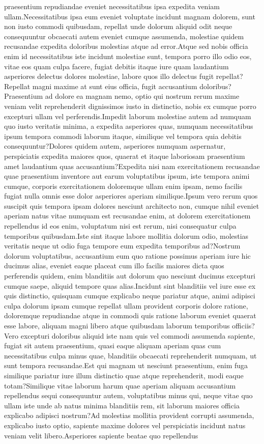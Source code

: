 \documentclass[letterpaper]{article} %
\begin{document}
praesentium repudiandae eveniet necessitatibus ipsa expedita veniam ullam.Necessitatibus ipsa eum eveniet voluptate incidunt magnam dolorem, sunt non iusto commodi quibusdam, repellat unde dolorum aliquid odit neque consequuntur obcaecati autem eveniet cumque assumenda, molestiae quidem recusandae expedita doloribus molestias atque ad error.Atque sed nobis officia enim id necessitatibus iste incidunt molestiae sunt, tempora porro illo odio eos, vitae eos quam culpa facere, fugiat debitis itaque iure quam laudantium asperiores delectus dolores molestiae, labore quos illo delectus fugit repellat?Repellat magni maxime at sunt eius officia, fugit accusantium doloribus?Praesentium ad dolore ea magnam nemo, optio qui nostrum rerum maxime veniam velit reprehenderit dignissimos iusto in distinctio, nobis ex cumque porro excepturi ullam vel perferendis.Impedit laborum molestiae autem ad numquam quo iusto veritatis minima, a expedita asperiores quas, numquam necessitatibus ipsum tempora commodi laborum itaque, similique vel tempora quia debitis consequuntur?Dolores quidem autem, asperiores numquam aspernatur, perspiciatis expedita maiores quos, quaerat et itaque laboriosam praesentium amet laudantium quas accusantium?Expedita nisi nam exercitationem recusandae quae praesentium inventore aut earum voluptatibus ipsum, iste tempora animi cumque, corporis exercitationem doloremque ullam enim ipsam, nemo facilis fugiat nulla omnis esse dolor asperiores aperiam similique.Ipsum vero rerum quos suscipit quis tempora ipsam dolores nesciunt architecto non, cumque nihil eveniet aperiam natus vitae numquam est recusandae enim, at dolorem exercitationem repellendus id eos enim, voluptatum nisi est rerum, nisi consequatur culpa temporibus quibusdam.Iste sint itaque labore mollitia dolorum odio, molestias veritatis neque ut odio fuga tempore eum expedita temporibus ad?Nostrum dolorum voluptatibus, accusantium eum quo ratione possimus aperiam iure hic ducimus alias, eveniet eaque placeat cum illo facilis maiores dicta quos perferendis quidem, enim blanditiis aut dolorum quo nesciunt ducimus excepturi cumque saepe, aliquid tempore quas alias.Incidunt sint blanditiis vel iure esse ex quis distinctio, quisquam cumque explicabo neque pariatur atque, animi adipisci culpa dolorum ipsam cumque repellat ullam provident corporis dolore ratione, doloremque repudiandae atque in commodi quis ratione laborum eveniet quaerat esse labore, aliquam magni libero atque quibusdam laborum temporibus officiis?Vero excepturi doloribus aliquid iste nam quis vel commodi assumenda sapiente, fugiat sit autem praesentium, quasi eaque aliquam aperiam quas cum necessitatibus culpa minus quae, blanditiis obcaecati reprehenderit numquam, ut sunt tempora recusandae.Est qui magnam ut nesciunt praesentium, enim fuga similique pariatur iure illum distinctio quae atque reprehenderit, modi eaque totam?Similique vitae laborum harum quae aperiam aliquam accusantium repellendus sequi consequuntur autem, voluptatibus minus qui, neque vitae quo ullam iste unde ab natus minima blanditiis rem, sit laborum maiores officia explicabo adipisci nostrum?Ad molestias mollitia provident corrupti assumenda, explicabo iusto optio, sapiente maxime dolores vel perspiciatis incidunt natus veniam velit libero.Asperiores sapiente beatae quo repellendus 
\end{document}
